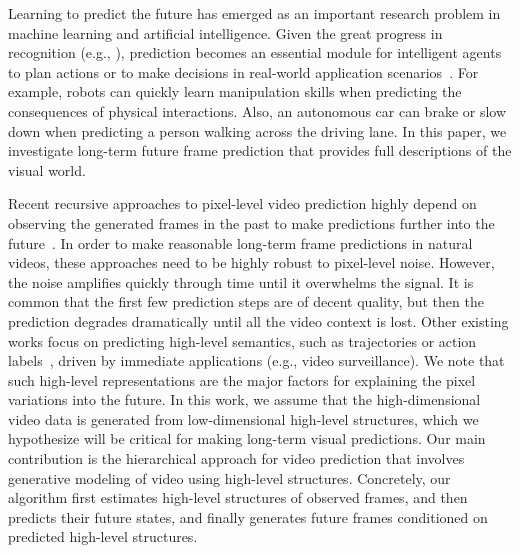 \documentclass{article}
\begin{document}
Learning to predict the future has emerged as an important research problem in machine learning and artificial intelligence. 
%
Given the great progress in recognition (e.g., \cite{alexnet,szegedy2015going}), prediction becomes an essential module for intelligent agents to plan actions or to make decisions in real-world application scenarios~\cite{jayaraman2015learning,jayaraman2016look,FinnGL16}.
For example, robots can quickly learn manipulation skills when predicting the consequences of physical interactions.
Also, an autonomous car can brake or slow down when predicting a person walking across the driving lane.
%
In this paper, we investigate long-term future frame prediction that provides full descriptions of the visual world.

Recent recursive approaches to pixel-level video prediction highly depend on observing the generated frames in the past to make predictions further into the future~\cite{Oh15,Mathieu16,Goroshin15,Srivastava15,Ranzato14,FinnGL16,Villegas17,Lotter17}.
In order to make reasonable long-term frame predictions in natural videos, these approaches need to be highly robust to pixel-level noise. However, the noise amplifies quickly through time until it overwhelms the signal.
It is common that the first few prediction steps are of decent quality, but then the prediction degrades dramatically until all the video context is lost.
%
Other existing works focus on predicting high-level semantics, such as trajectories or action labels~\cite{Walker14,chao:cvpr2017,yuen2010data,lee2015modeling}, driven by immediate applications (e.g., video surveillance).
%
We note that such high-level representations are the major factors for explaining the pixel variations into the future.
In this work, we assume that the high-dimensional video data is generated from low-dimensional high-level structures, which we hypothesize will be critical for making long-term visual predictions.
%
Our main contribution is the hierarchical approach for video prediction that involves generative modeling of video using high-level structures.
%
Concretely, our algorithm first estimates high-level structures of observed frames, and then predicts their future states, and finally generates future frames conditioned on predicted high-level structures.
%
\end{document}
